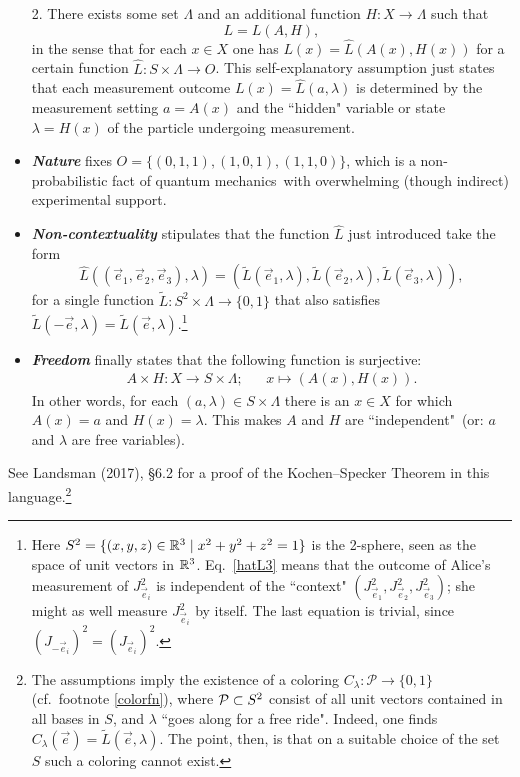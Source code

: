 \documentclass[11pt,a4paper]{article}
\numberwithin{equation}{section}
\newcommand{\hi}[1]{\emph{\textbf{#1}}}
\newcommand{\qm}{quantum mechanics}
\newcommand{\er}{\eqref}
\newcommand{\beq}{\begin{equation}}
\newcommand{\eeq}{\end{equation}}
\newcommand{\til}{\tilde}
\newcommand{\raw}{\rightarrow}
\newcommand{\x}{\times}
\newcommand{\lm}{\lambda} \newcommand{\Lm}{\Lambda}
\begin{document}
\begin{itemize}
2. There exists some set $\Lm$ and an additional function 
$H:X\raw \Lm$ such that  
\beq
L=L(A,H),
\eeq
 in the sense that
 for each $x\in X$ one has $L(x)=\hat{L}(A(x),H(x))$
  for a certain function  $\hat{L}:S \x \Lm\raw O$.  This self-explanatory assumption just states that each measurement outcome 
  $L(x)=\hat{L}(a,\lm)$ 
  is determined by the  measurement setting $a=A(x)$ and the ``hidden" variable or state $\lm=H(x)$  of the particle
 undergoing measurement.
  \item  \hi{Nature}  fixes 
 $O=\{(0,1,1), (1,0,1), (1,1,0)\}$, which is a non-probabilistic fact of \qm\ with overwhelming (though  indirect) experimental support. 
   \item \hi{Non-contextuality}
stipulates that the function $\hat{L}$ just introduced take the form
  \beq
  \hat{L}((\vec{e}_1,\vec{e}_2,\vec{e}_3),\lm)=(\til{L}(\vec{e}_1,\lm), \til{L}(\vec{e}_2,\lm), \til{L}(\vec{e}_3,\lm)), \label{hatL3}
  \eeq
  for a single function $\til{L}:S^2\x \Lm\raw\{0,1\}$ that also satisfies 
$\til{L}(-\vec{e},\lm)=\til{L}(\vec{e},\lm)$.\footnote{Here $S^2=\{(x,y,z)\in{\mathbb R}^3\mid x^2+y^2+z^2=1\}$ is the 2-sphere, seen as the space of unit vectors in ${\mathbb R}^3$.
Eq.\ \er{hatL3} means that the outcome of Alice's measurement 
of $J_{\vec{e}_i}^2$ is independent of the ``context" $(J_{\vec{e}_1}^2, J_{\vec{e}_2}^2, J_{\vec{e}_3}^2)$; she might as well measure $J_{\vec{e}_i}^2$ by itself. The last equation is trivial, since $(J_{-\vec{e}_i})^2=(J_{\vec{e}_i})^2$.
}
  \item \hi{Freedom} finally states that the following function is surjective:
\begin{align}
A\x H:X\raw S\x \Lm; && x\mapsto (A(x),H(x)).
\end{align}
 In other words, 
 for each $(a,\lm)\in S\x\Lm$ there is an $x\in X$  for which $A(x)=a$ and $H(x)=\lm$. This makes   $A$ and $H$ are ``independent"\
 (or: $a$ and $\lm$ are free variables).
  \end{itemize}
See Landsman (2017), \S6.2 for a proof of the Kochen--Specker Theorem in this language.\footnote{
The assumptions imply the existence of a coloring $C_{\lm}: \mathcal{P}\raw\{0,1\}$ (cf.\ footnote \ref{colorfn}), where 
${\mathcal P}\subset S^2$ consist of all unit vectors contained in all bases in $S$, and $\lm$ ``goes along for a free ride". Indeed, one finds
$C_{\lm}(\vec{e})=\til{L}(\vec{e},\lm)$. The point, then, is that on a suitable choice of the set $S$ such a coloring cannot exist. 
}
\smallskip
\end{document}
